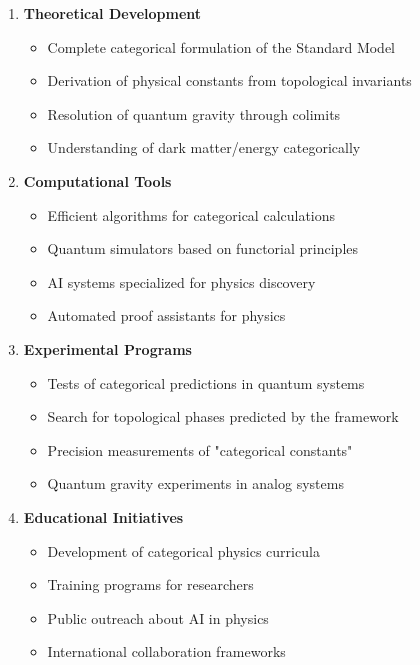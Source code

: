 \documentclass[11pt,a4paper]{article}
\begin{document}
\begin{enumerate}
    \item \textbf{Theoretical Development}
    \begin{itemize}
        \item Complete categorical formulation of the Standard Model
        \item Derivation of physical constants from topological invariants
        \item Resolution of quantum gravity through colimits
        \item Understanding of dark matter/energy categorically
    \end{itemize}
    
    \item \textbf{Computational Tools}
    \begin{itemize}
        \item Efficient algorithms for categorical calculations
        \item Quantum simulators based on functorial principles
        \item AI systems specialized for physics discovery
        \item Automated proof assistants for physics
    \end{itemize}
    
    \item \textbf{Experimental Programs}
    \begin{itemize}
        \item Tests of categorical predictions in quantum systems
        \item Search for topological phases predicted by the framework
        \item Precision measurements of "categorical constants"
        \item Quantum gravity experiments in analog systems
    \end{itemize}
    
    \item \textbf{Educational Initiatives}
    \begin{itemize}
        \item Development of categorical physics curricula
        \item Training programs for researchers
        \item Public outreach about AI in physics
        \item International collaboration frameworks
    \end{itemize}
\end{enumerate}
\end{document}
